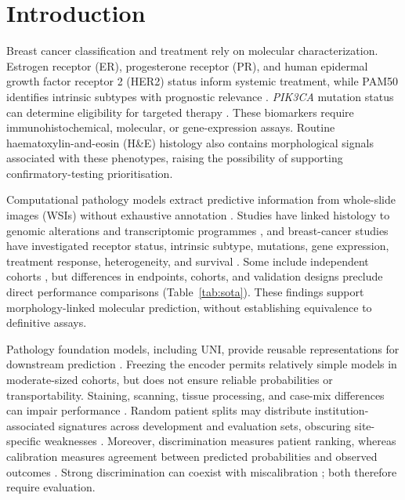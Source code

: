 \documentclass[pdflatex]{cas-dc}
\theoremstyle{remark}
\theoremstyle{plain}
\begin{document}
\section{Introduction}\label{sec:introduction}

Breast cancer classification and treatment rely on molecular characterization. Estrogen receptor (ER), progesterone receptor (PR), and human epidermal growth factor receptor 2 (HER2) status inform systemic treatment, while PAM50 identifies intrinsic subtypes with prognostic relevance \citep{TCGA2012,Parker2009}. \textit{PIK3CA} mutation status can determine eligibility for targeted therapy \citep{Andre2019}. These biomarkers require immunohistochemical, molecular, or gene-expression assays. Routine haematoxylin-and-eosin (H\&E) histology also contains morphological signals associated with these phenotypes, raising the possibility of supporting confirmatory-testing prioritisation.

Computational pathology models extract predictive information from whole-slide images (WSIs) without exhaustive annotation \citep{Campanella2019,Lu2021}. Studies have linked histology to genomic alterations and transcriptomic programmes \citep{Kather2020,Fu2020,Schmauch2020}, and breast-cancer studies have investigated receptor status, intrinsic subtype, mutations, gene expression, treatment response, heterogeneity, and survival \citep{Couture2018,Rawat2020,Wang2021BRCA,Qu2021,Ektefaie2021,Duanmu2022,Liu2024Protein,Wang2023ITH,Ekholm2024,Frascarelli2024}. Some include independent cohorts \citep{Liu2024Protein,Ekholm2024,Miao2026}, but differences in endpoints, cohorts, and validation designs preclude direct performance comparisons (Table~\ref{tab:sota}). These findings support morphology-linked molecular prediction, without establishing equivalence to definitive assays.

Pathology foundation models, including UNI, provide reusable representations for downstream prediction \citep{Chen2024UNI,Vorontsov2024,Ding2025}. Freezing the encoder permits relatively simple models in moderate-sized cohorts, but does not ensure reliable probabilities or transportability. Staining, scanning, tissue processing, and case-mix differences can impair performance \citep{Zech2018,Tellez2019,Howard2021,Jahanifar2025}. Random patient splits may distribute institution-associated signatures across development and evaluation sets, obscuring site-specific weaknesses \citep{Howard2021}. Moreover, discrimination measures patient ranking, whereas calibration measures agreement between predicted probabilities and observed outcomes \citep{VanCalster2019}. Strong discrimination can coexist with miscalibration \citep{Guo2017,Minderer2021}; both therefore require evaluation.
\end{document}
